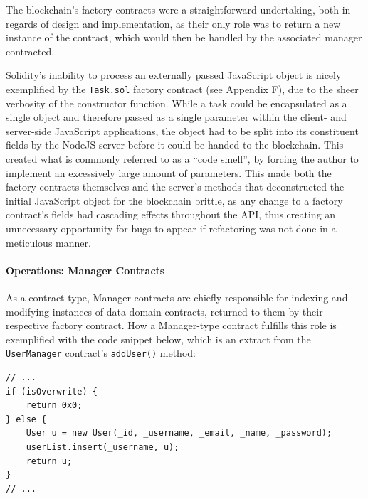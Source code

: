 The blockchain's factory contracts were a straightforward undertaking,
both in regards of design and implementation, as their only role was to
return a new instance of the contract, which would then be handled by
the associated manager contracted.

Solidity's inability to process an externally passed JavaScript object
is nicely exemplified by the \texttt{Task.sol} factory contract (see Appendix F), due to the sheer verbosity of the
constructor function. While a task could be encapsulated as a single
object and therefore passed as a single parameter within the client- and
server-side JavaScript applications, the object had to be split into its
constituent fields by the NodeJS server before it could be handed to the
blockchain. This created what is commonly referred to as a ``code
smell''\cite{tufano2015codesmell}, by forcing the author to
implement an excessively large amount of parameters. This made both the
factory contracts themselves and the server's methods that deconstructed
the initial JavaScript object for the blockchain brittle, as any change
to a factory contract's fields had cascading effects throughout the API,
thus creating an unnecessary opportunity for bugs to appear if
refactoring was not done in a meticulous manner.

\paragraph{Operations: Manager
Contracts}\label{operations-manager-contracts}

As a contract type, Manager contracts are chiefly responsible for
indexing and modifying instances of data domain contracts, returned to
them by their respective factory contract. How a Manager-type contract
fulfills this role is exemplified with the code snippet below, which is
an extract from the \texttt{UserManager} contract's \texttt{addUser()}
method:

\begin{verbatim}
// ...
if (isOverwrite) {
    return 0x0;
} else {
    User u = new User(_id, _username, _email, _name, _password);
    userList.insert(_username, u);
    return u;
}
// ...
\end{verbatim}

